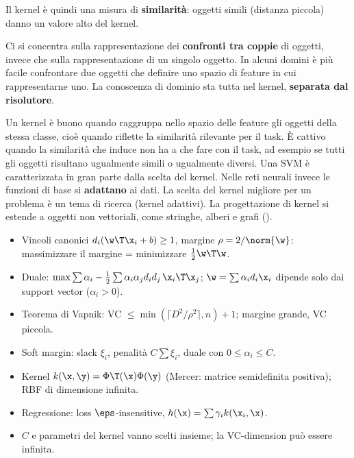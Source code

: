 Il kernel è quindi una misura di \textbf{similarità}: oggetti simili (distanza piccola) danno un valore alto del
kernel.

\begin{idea}
Ci si concentra sulla rappresentazione dei \textbf{confronti tra coppie} di oggetti, invece che sulla
rappresentazione di un singolo oggetto. In alcuni domini è più facile confrontare due oggetti che definire uno
spazio di feature in cui rappresentarne uno. La conoscenza di dominio sta tutta nel kernel, \textbf{separata dal
risolutore}.
\end{idea}

Un kernel è buono quando raggruppa nello spazio delle feature gli oggetti della stessa classe, cioè quando riflette
la similarità rilevante per il task. È cattivo quando la similarità che induce non ha a che fare con il task, ad
esempio se tutti gli oggetti risultano ugualmente simili o ugualmente diversi. Una SVM è caratterizzata in gran
parte dalla scelta del kernel. Nelle reti neurali invece le funzioni di base si \textbf{adattano} ai dati. La
scelta del kernel migliore per un problema è un tema di ricerca (kernel adattivi). La progettazione di kernel si
estende a oggetti non vettoriali, come stringhe, alberi e grafi ().

\begin{puntichiave}
\begin{itemize}
  \item Vincoli canonici $d_i(\w\T\x_i+b)\ge1$, margine $\rho = 2/\norm{\w}$: massimizzare il margine = minimizzare
        $\frac12\w\T\w$.
  \item Duale: $\max\sum\alpha_i - \frac12\sum\alpha_i\alpha_jd_id_j\,\x_i\T\x_j$; $\w = \sum\alpha_id_i\x_i$ dipende solo
        dai support vector ($\alpha_i>0$).
  \item Teorema di Vapnik: VC $\le\min(\lceil D^2/\rho^2\rceil,n)+1$; margine grande, VC piccola.
  \item Soft margin: slack $\xi_i$, penalità $C\sum\xi_i$, duale con $0\le\alpha_i\le C$.
  \item Kernel $k(\x,\y) = \Phi\T(\x)\Phi(\y)$ (Mercer: matrice semidefinita positiva); RBF di dimensione infinita.
  \item Regressione: loss $\eps$-insensitive, $h(\x) = \sum\gamma_ik(\x_i,\x)$.
  \item $C$ e parametri del kernel vanno scelti insieme; la VC-dimension può essere infinita.
\end{itemize}
\end{puntichiave}

